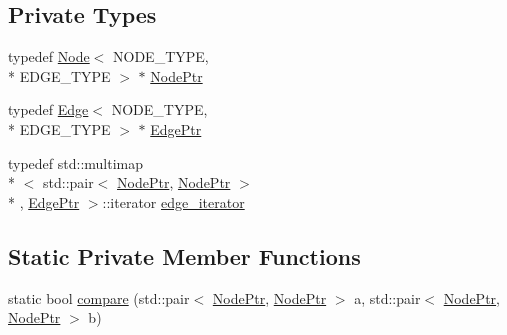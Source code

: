 \subsection*{Private Types}
\begin{DoxyCompactItemize}
\item 
typedef \hyperlink{class_node}{Node}$<$ N\+O\+D\+E\+\_\+\+T\+Y\+P\+E, \\*
E\+D\+G\+E\+\_\+\+T\+Y\+P\+E $>$ $\ast$ \hyperlink{class_complex_network_a1a0d11ddc5f0c146a0e921b58bb5eb3e}{Node\+Ptr}
\item 
typedef \hyperlink{class_edge}{Edge}$<$ N\+O\+D\+E\+\_\+\+T\+Y\+P\+E, \\*
E\+D\+G\+E\+\_\+\+T\+Y\+P\+E $>$ $\ast$ \hyperlink{class_complex_network_af07ec30729e69a40c4c5ac2e98381206}{Edge\+Ptr}
\item 
typedef std\+::multimap\\*
$<$ std\+::pair$<$ \hyperlink{class_complex_network_a1a0d11ddc5f0c146a0e921b58bb5eb3e}{Node\+Ptr}, \hyperlink{class_complex_network_a1a0d11ddc5f0c146a0e921b58bb5eb3e}{Node\+Ptr} $>$\\*
, \hyperlink{class_complex_network_af07ec30729e69a40c4c5ac2e98381206}{Edge\+Ptr} $>$\+::iterator \hyperlink{class_complex_network_af5db8f579c2622ec27f2cfb6835d8466}{edge\+\_\+iterator}
\end{DoxyCompactItemize}
\subsection*{Static Private Member Functions}
\begin{DoxyCompactItemize}
\item 
static bool \hyperlink{class_complex_network_a8bf5d81ac027456c5578a3ef7f499a4b}{compare} (std\+::pair$<$ \hyperlink{class_complex_network_a1a0d11ddc5f0c146a0e921b58bb5eb3e}{Node\+Ptr}, \hyperlink{class_complex_network_a1a0d11ddc5f0c146a0e921b58bb5eb3e}{Node\+Ptr} $>$ a, std\+::pair$<$ \hyperlink{class_complex_network_a1a0d11ddc5f0c146a0e921b58bb5eb3e}{Node\+Ptr}, \hyperlink{class_complex_network_a1a0d11ddc5f0c146a0e921b58bb5eb3e}{Node\+Ptr} $>$ b)
\end{DoxyCompactItemize}
